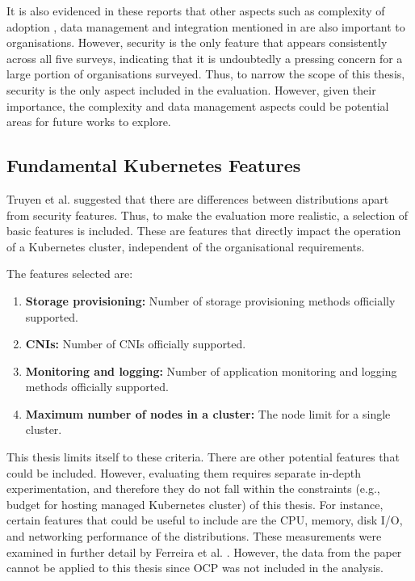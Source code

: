 It is also evidenced in these reports that other aspects such as complexity of adoption \cite{CNCFAnnualSurvey2024,2024StateProduction}, data management and integration mentioned in \cite{2022AnnualKubernetes,broadcomStateKubernetes20232023} are also important to organisations. However, security is the only feature that appears consistently across all five surveys, indicating that it is undoubtedly a pressing concern for a large portion of organisations surveyed. Thus, to narrow the scope of this thesis, security is the only aspect included in the evaluation. However, given their importance, the complexity and data management aspects could be potential areas for future works to explore.

\subsection{Fundamental Kubernetes Features}

Truyen et al. \cite{truyenManagingFeatureCompatibility2020} suggested that there are differences between distributions apart from security features. Thus, to make the evaluation more realistic, a selection of basic features is included. These are features that directly impact the operation of a Kubernetes cluster, independent of the organisational requirements.

The features selected are:

\begin{enumerate}
  \item \textbf{Storage provisioning:} Number of storage provisioning methods officially supported.
  \item \textbf{CNIs:} Number of CNIs officially supported.
  \item \textbf{Monitoring and logging:} Number of application monitoring and logging methods officially supported.
  \item \textbf{Maximum number of nodes in a cluster:} The node limit for a single cluster.
\end{enumerate}

This thesis limits itself to these criteria. There are other potential features that could be included. However, evaluating them requires separate in-depth experimentation, and therefore they do not fall within the constraints (e.g., budget for hosting managed Kubernetes cluster) of this thesis. For instance, certain features that could be useful to include are the CPU, memory, disk I/O, and networking performance of the distributions. These measurements were examined in further detail by Ferreira et al. \cite{pereiraferreiraPerformanceEvaluationContainers2019}. However, the data from the paper cannot be applied to this thesis since OCP was not included in the analysis.

